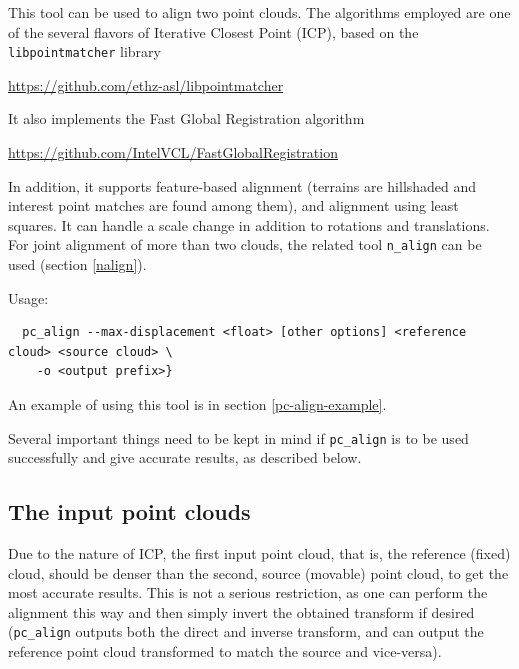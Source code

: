 This tool can be used to align two point clouds. The algorithms employed are
one of the several flavors of Iterative Closest Point (ICP), based on
the \texttt{libpointmatcher} library~\cite{Pomerleau12comp}
\begin{center}
\url{https://github.com/ethz-asl/libpointmatcher}
\end{center} 
It also implements the Fast Global Registration algorithm 
\begin{center}
\url{https://github.com/IntelVCL/FastGlobalRegistration}
\end{center}
In addition, it supports feature-based alignment (terrains are
hillshaded and interest point matches are found among them), and alignment using least
squares. It can handle a scale change in addition to rotations and
translations. For joint alignment of more than two clouds, the related
tool \texttt{n\_align} can be used (section \ref{nalign}).

\medskip
Usage:
\begin{verbatim}
  pc_align --max-displacement <float> [other options] <reference cloud> <source cloud> \
    -o <output prefix>}
\end{verbatim}

An example of using this tool is in section \ref{pc-align-example}.

Several important things need to be kept in mind if \texttt{pc\_align} is to be
used successfully and give accurate results, as described below.

\subsection{The input point clouds}

Due to the nature of ICP, the first input point cloud, that is, the
reference (fixed) cloud, should be denser than the second, source (movable)
point cloud, to get the most accurate results. This is not a serious
restriction, as one can perform the alignment this way and then simply
invert the obtained transform if desired (\texttt{pc\_align} outputs
both the direct and inverse transform, and can output the reference
point cloud transformed to match the source and vice-versa).

